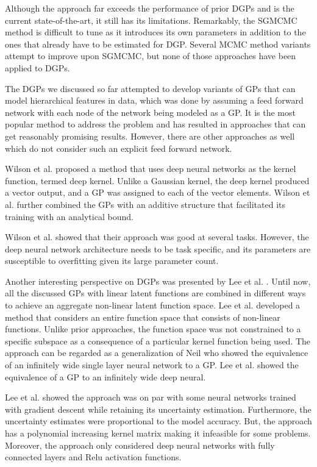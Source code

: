\documentclass[letterpaper,11pt]{extarticle}
\begin{document}
Although the approach far exceeds the performance of prior DGPs and is the current state-of-the-art, it still has its limitations. Remarkably, the SGMCMC method is difficult to tune as it introduces its own parameters in addition to the ones that already have to be estimated for DGP. Several MCMC method variants attempt to improve upon SGMCMC, but none of those approaches have been applied to DGPs. 

The DGPs we discussed so far attempted to develop variants of GPs that can model hierarchical features in data, which was done by assuming a feed forward network with each node of the network being modeled as a GP. It is the most popular method to address the problem and has resulted in approaches that can get reasonably promising results. However, there are other approaches as well which do not consider such an explicit feed forward network.

Wilson et al. \cite{WilsonHSX16} proposed a method that uses deep neural networks as the kernel function, termed deep kernel. Unlike a Gaussian kernel, the deep kernel produced a vector output, and a GP was assigned to each of the vector elements. Wilson et al. further combined the GPs with an additive structure that facilitated its training with an analytical bound. 

Wilson et al. \cite{WilsonHSX16} showed that their approach was good at several tasks. However, the deep neural network architecture needs to be task specific, and its parameters are susceptible to overfitting given its large parameter count.  

Another interesting perspective on DGPs was presented by Lee et al. \cite{LeeBNSPD18}. Until now, all the discussed GPs with linear latent functions are combined in different ways to achieve an aggregate non-linear latent function space. Lee et al. developed a method that considers an entire function space that consists of non-linear functions. Unlike prior approaches, the function space was not constrained to a specific subspace as a consequence of a particular kernel function being used. The approach can be regarded as a generalization of Neil \cite{Neal96} who showed the equivalence of an infinitely wide single layer neural network to a GP. Lee et al. showed the equivalence of a GP to an infinitely wide deep neural. 

Lee et al. \cite{LeeBNSPD18} showed the approach was on par with some neural networks trained with gradient descent while retaining its uncertainty estimation. Furthermore, the uncertainty estimates were proportional to the model accuracy. But, the approach has a polynomial increasing kernel matrix making it infeasible for some problems. Moreover, the approach only considered deep neural networks with fully connected layers and Relu activation functions.   
\end{document}
